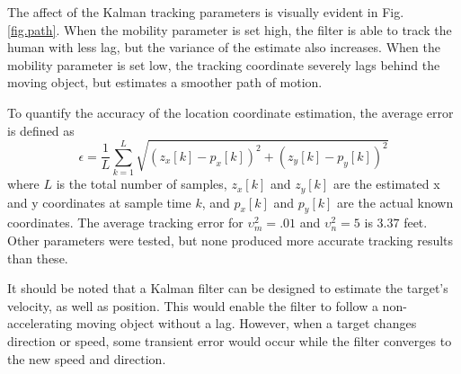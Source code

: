 \documentclass[journal]{IEEEtran}
\begin{document}
\begin{figure*}[htp]
\centering
{}
\caption{The location of human movement moving along a known rectangular path is estimated using varying $\upsilon_m$ and constant $\upsilon^2_n = 5$. In (a) and (c) the mobility is set empirically to track objects moving at a few feet per second.  In (b) and (d), the mobility is set too low, causing the tracking filter to lag excessively.}
\label{fig.path}
\end{figure*}

The affect of the Kalman tracking parameters is visually evident in Fig. \ref{fig.path}. When the mobility parameter is set high, the filter is able to track the human with less lag, but the variance of the estimate also increases.  When the mobility parameter is set low, the tracking coordinate severely lags behind the moving object, but estimates a smoother path of motion. 

To quantify the accuracy of the location coordinate estimation, the average error is defined as
\begin{equation} \label{eq.error}
\epsilon = \frac{1}{L} \sum_{k=1}^L \sqrt{(z_x[k] - p_x[k])^2 + (z_y[k] - p_y[k])^2}
\end{equation}
where $L$ is the total number of samples, $z_x[k]$ and $z_y[k]$ are the estimated x and y coordinates at sample time $k$, and $p_x[k]$ and $p_y[k]$ are the actual known coordinates. The average tracking error for $\upsilon^2_m = .01$ and $\upsilon^2_n = 5$ is $3.37$ feet. Other parameters were tested, but none produced more accurate tracking results than these.

It should be noted that a Kalman filter can be designed to estimate the target's velocity, as well as position. This would enable the filter to follow a non-accelerating moving object without a lag. However, when a target changes direction or speed, some transient error would occur while the filter converges to the new speed and direction.
\end{document}
